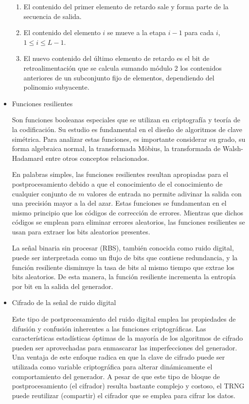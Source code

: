 \begin{itemize}
                    \begin{enumerate}[noitemsep, label=(\roman*)]
                         \item El contenido del primer elemento de retardo sale y forma parte de la secuencia de salida.
                         \item El contenido del elemento $i$ se mueve a la etapa $i - 1$ para cada $i$, $1 \leq i \leq L - 1$.
                         \item El nuevo contenido del último elemento de retardo es el bit de retroalimentación que se calcula sumando módulo 2 los contenidos anteriores de un subconjunto fijo de elementos, dependiendo del polinomio subyacente.
                     \end{enumerate}	
                    
                    \item Funciones resilientes
                    
                        Son funciones booleanas especiales que se utilizan en criptografía y teoría de la codificación. Su estudio es fundamental en el diseño de algoritmos de clave simétrica. Para analizar estas funciones, es importante considerar su grado, su forma algebraica normal, la transformada Möbius, la transformada de Walsh-Hadamard entre otros conceptos relacionados.

                        En palabras simples, las funciones resilientes resultan apropiadas para el postprocesamiento debido a que el conocimiento de el conocimiento de cualquier conjunto de $m$ valores de entrada no permite adivinar la salida con una precisión mayor a la del azar. Estas funciones se fundamentan en el mismo principio que los códigos de corrección de errores. Mientras que dichos códigos se emplean para eliminar errores aleatorios, las funciones resilientes se usan para extraer los bits aleatorios presentes.

                        La señal binaria sin procesar (RBS), también conocida como ruido digital, puede ser interpretada como un flujo de bits que contiene redundancia, y la función resiliente disminuye la tasa de bits al mismo tiempo que extrae los bits aleatorios. De esta manera, la función resiliente incrementa la entropía por bit en la salida del generador. 

                    \item Cifrado de la señal de ruido digital
                    
                        Este tipo de postprocesamiento del ruido digital emplea las propiedades de difusión y confusión inherentes a las funciones criptográficas. Las características estadísticas óptimas de la mayoría de los algoritmos de cifrado pueden ser aprovechadas para enmascarar las imperfecciones del generador. Una ventaja de este enfoque radica en que la clave de cifrado puede ser utilizada como variable criptográfica para alterar dinámicamente el comportamiento del generador. A pesar de que este tipo de bloque de postprocesamiento (el cifrador) resulta bastante complejo y costoso, el TRNG puede reutilizar (compartir) el cifrador que se emplea para cifrar los datos.
                    

\end{itemize}

